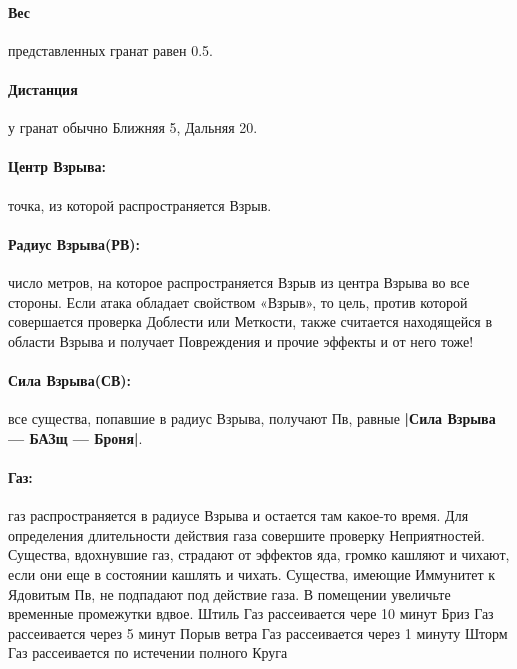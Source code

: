 \paragraph{Вес} представленных гранат равен 0.5.
\paragraph{Дистанция} у гранат обычно Ближняя 5, Дальняя 20.
\paragraph{Центр Взрыва:} точка, из которой распространяется Взрыв.
\paragraph{Радиус Взрыва(РВ):} число метров, на которое распространяется Взрыв из центра Взрыва во все стороны. Если атака обладает свойством «Взрыв», то цель, против которой совершается проверка Доблести или Меткости, также считается находящейся в области Взрыва и получает Повреждения и прочие эффекты и от него тоже!
\paragraph{Сила Взрыва(СВ):} все существа, попавшие в радиус Взрыва, получают Пв, равные \textbf{|Сила Взрыва — БАЗщ — Броня|}.
\paragraph{Газ:} газ распространяется в радиусе Взрыва и остается там какое-то время. Для определения длительности действия газа совершите проверку Неприятностей. Существа, вдохнувшие газ, страдают от эффектов яда, громко кашляют и чихают, если они еще в состоянии кашлять и чихать. Существа, имеющие Иммунитет к Ядовитым Пв, не подпадают под действие газа. В помещении увеличьте временные промежутки вдвое.
\trouble
{Штиль}%
{Газ рассеивается чере 10 минут}%
{Бриз}%
{Газ рассеивается через 5 минут}%
{Порыв ветра}%
{Газ рассеивается через 1 минуту}%
{Шторм}%
{Газ рассеивается по истечении полного Круга}%

